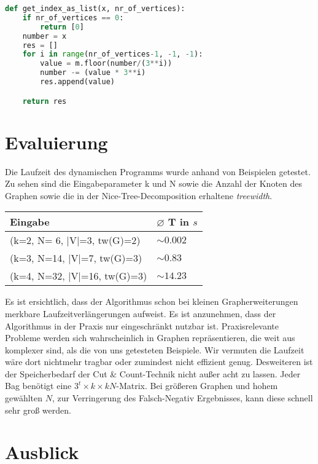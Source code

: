 \begin{svgraybox}
\begin{lstlisting}[language=python,label={code:as_list}, basicstyle=\small, caption=Funktion get\_index\_as\_list zur Berechnung der ternären Färbung aus dem Index]
def get_index_as_list(x, nr_of_vertices):
    if nr_of_vertices == 0:
        return [0]
    number = x
    res = []
    for i in range(nr_of_vertices-1, -1, -1):
        value = m.floor(number/(3**i))
        number -= (value * 3**i)
        res.append(value)

    return res
\end{lstlisting}
\end{svgraybox}

\section{Evaluierung}
\label{sec:impl_eval}
Die Laufzeit des dynamischen Programms wurde anhand von Beispielen getestet. Zu sehen sind die Eingabeparameter k und N sowie die Anzahl der Knoten des Graphen sowie die in der Nice-Tree-Decomposition erhaltene \textit{treewidth}.
\begin{table}
\centering
\begin{tabular}{l | l} 
\textbf{Eingabe} & \textbf{ $\varnothing$ T in $s$}\\
\hline
(k=2, N= 6, |V|=3, tw(G)=2) & $ \sim 0.002$ \\
(k=3, N=14, |V|=7, tw(G)=3) & $ \sim 0.83$ \\
(k=4, N=32, |V|=16, tw(G)=3) & $ \sim 14.23$ \\
\end{tabular}
\end{table}

Es ist ersichtlich, dass der Algorithmus schon bei kleinen Grapherweiterungen merkbare Laufzeitverlängerungen aufweist. Es ist anzunehmen, dass der Algorithmus in der Praxis nur eingeschränkt nutzbar ist. Praxisrelevante Probleme werden sich wahrscheinlich in Graphen repräsentieren, die weit aus komplexer sind, als die von uns getesteten Beispiele. Wir vermuten die Laufzeit wäre dort nichtmehr tragbar oder zumindest nicht effizient genug. Desweiteren ist der Speicherbedarf der Cut \& Count-Technik nicht außer acht zu lassen. Jeder Bag benötigt eine $3^t\times k\times kN$-Matrix. Bei größeren Graphen und hohem gewählten $N$, zur Verringerung des Falsch-Negativ Ergebnisses, kann diese schnell sehr groß werden.

\section{Ausblick}
\label{sec:impl_outlook}

